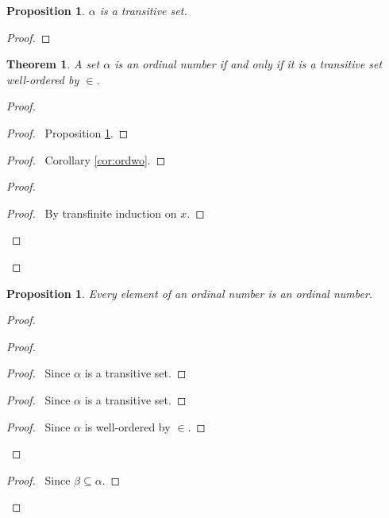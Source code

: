\documentclass{book}
\let\qed\relax
\newtheorem{prop}[ax]{Proposition}
\newtheorem{thm}[ax]{Theorem}
\theoremstyle{definition}
\begin{document}
\begin{prop}
\label{prop:ordtrans}
$\alpha$ is a transitive set.
\end{prop}

\begin{proof}
\pf
{}
\qed
\end{proof}

\begin{thm}
A set $\alpha$ is an ordinal number if and only if it is a transitive set well-ordered by $\in$.
\end{thm}

\begin{proof}
\pf
{}
\begin{proof}
	\pf\ Proposition \ref{prop:ordtrans}.
\end{proof}
\begin{proof}
	\pf\ Corollary \ref{cor:ordwo}.
\end{proof}
\begin{proof}
	\begin{proof}
		\pf\ By transfinite induction on $x$.
	\end{proof}
\end{proof}
\qed
\end{proof}

\begin{prop}
Every element of an ordinal number is an ordinal number.
\end{prop}

\begin{proof}
\pf
{}
\begin{proof}
	\begin{proof}
		\pf\ Since $\alpha$ is a transitive set.
	\end{proof}
	\begin{proof}
		\pf\ Since $\alpha$ is a transitive set.
	\end{proof}
	\begin{proof}
		\pf\ Since $\alpha$ is well-ordered by $\in$.
	\end{proof}
\end{proof}
\begin{proof}
	\pf\ Since $\beta \subseteq \alpha$.
\end{proof}
\qed
\end{proof}
\end{document}
